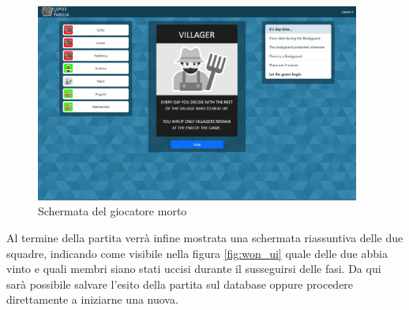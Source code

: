 \begin{figure}[H]
\begin{minipage}{0.25\textwidth}
    \end{minipage}\hfill
    \begin{minipage}{0.75\textwidth}
        \centering
        \includegraphics[width=0.95\textwidth]{img/screen/desktop/dead_desktop.png}
    \end{minipage}
    \caption{Schermata del giocatore morto}
    \label{fig:dead_ui}
\end{figure}

Al termine della partita verrà infine mostrata una schermata riassuntiva delle due squadre, indicando come visibile nella figura \ref{fig:won_ui} quale delle due abbia vinto e quali membri siano stati uccisi durante il susseguirsi delle fasi. Da qui sarà possibile salvare l'esito della partita sul database oppure procedere direttamente a iniziarne una nuova.

